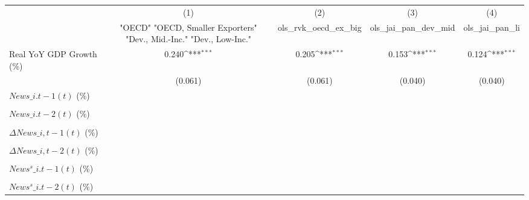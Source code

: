 {
\def\sym#1{\ifmmode^{#1}\else\(^{#1}\)\fi}
\begin{tabular}{l*{4}{c}}
\toprule
                    &\multicolumn{1}{c}{(1)}&\multicolumn{1}{c}{(2)}&\multicolumn{1}{c}{(3)}&\multicolumn{1}{c}{(4)}\\
                    &\multicolumn{1}{c}{ "OECD" "OECD, Smaller Exporters" "Dev., Mid.-Inc." "Dev., Low-Inc."}&\multicolumn{1}{c}{ols\_rvk\_oecd\_ex\_big}&\multicolumn{1}{c}{ols\_jai\_pan\_dev\_mid}&\multicolumn{1}{c}{ols\_jai\_pan\_li}\\
\midrule
Real YoY GDP Growth (\%)&       0.240\sym{***}&       0.205\sym{***}&       0.153\sym{***}&       0.124\sym{***}\\
                    &     (0.061)         &     (0.061)         &     (0.040)         &     (0.040)         \\
\addlinespace
$ News\_{i.t-1}(t)$ (\%)&                     &                     &                     &                     \\
                    &                     &                     &                     &                     \\
\addlinespace
$ News\_{i.t-2}(t)$ (\%)&                     &                     &                     &                     \\
                    &                     &                     &                     &                     \\
\addlinespace
$ \Delta News\_{i,t-1}(t)$ (\%)&                     &                     &                     &                     \\
                    &                     &                     &                     &                     \\
\addlinespace
$ \Delta News\_{i,t-2}(t)$ (\%)&                     &                     &                     &                     \\
                    &                     &                     &                     &                     \\
\addlinespace
$ News^s\_{i.t-1}(t)$ (\%)&                     &                     &                     &                     \\
                    &                     &                     &                     &                     \\
\addlinespace
$ News^s\_{i.t-2}(t)$ (\%)&                     &                     &                     &                     \\

\end{tabular}}
